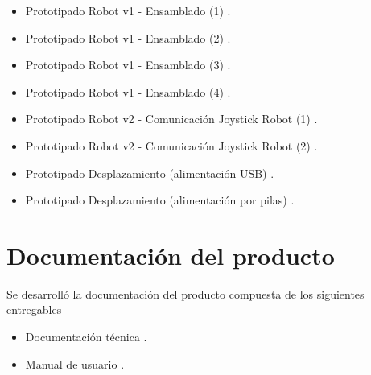 \begin{itemize}
	\item Prototipado Robot v1 - Ensamblado (1) \cite{Prototipado_Ensamblado_1}.	
	\item Prototipado Robot v1 - Ensamblado (2) \cite{Prototipado_Ensamblado_2}.
	\item Prototipado Robot v1 - Ensamblado (3) \cite{Prototipado_Ensamblado_3}.
	\item Prototipado Robot v1 - Ensamblado (4) \cite{Prototipado_Ensamblado_4}.
	\item Prototipado Robot v2 - Comunicación Joystick Robot (1) \cite{Prototipado_Comunicacion_JoystickRobot1}.
	\item Prototipado Robot v2 - Comunicación Joystick Robot (2) \cite{Prototipado_Comunicacion_JoystickRobot2}.
	\item Prototipado Desplazamiento (alimentación USB) \cite{Prototipado_Desplazamiento_USB}.
	\item Prototipado Desplazamiento (alimentación por pilas) \cite{Prototipado_Desplazamiento_Pilas}.

\end{itemize}




\section{Documentación del producto }

Se desarrolló la documentación del producto compuesta de los siguientes entregables
\begin{itemize}
	\item Documentación técnica \cite{Robot_Tecnical_doc}.
	\item Manual de usuario \cite{Robot_User_manual}.
\end{itemize}












